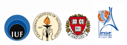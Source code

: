 \documentclass[oneside,english,onecolumn,letterpaper]{book}
\begin{document}
\begin{figure}[htbp]
\noindent \begin{centering}
\includegraphics[width=0.125\textwidth]{figures/logo_IUF}\vspace*{2truemm}
\includegraphics[width=0.135\textwidth]{figures/logo_Caltech}\vspace*{2truemm}
\includegraphics[width=0.135\textwidth]{figures/logo_Harvard}\vspace*{2truemm}
\includegraphics[width=0.135\textwidth]{figures/logo_IPGP}\vspace*{2truemm}
\par\end{centering}


\end{figure}
\end{document}
